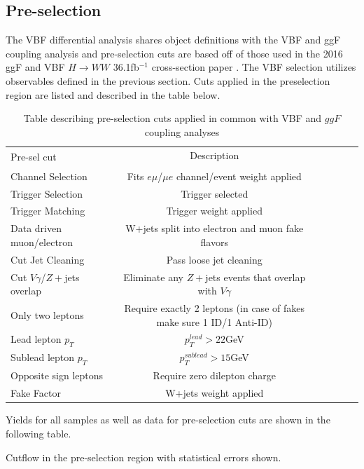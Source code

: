\subsection{Pre-selection}
The VBF differential analysis shares object definitions with the VBF and ggF coupling analysis and pre-selection cuts are based off of those used in the 2016 ggF and VBF $H\rightarrow WW$ 36.1fb$^{-1}$ cross-section paper \cite{Aaboud_2019}. The VBF selection utilizes observables defined in the previous section. Cuts applied in the preselection region are listed and described in the table below. 
\begin{table}[h!]
\centering
\small{
\begin{tabular}{|l|c|c|c|c|c|}
\hline
\multirow{2}{*}{Pre-sel cut}   & Description \\
				&	 \\
\hline
Channel Selection	& Fits $e\mu$/$\mu e$ channel/event weight applied\\  
Trigger Selection	&  Trigger selected \\
Trigger Matching	&  Trigger weight applied  \\
Data driven muon/electron & W+jets split into electron and muon fake flavors \\
Cut Jet Cleaning	& Pass loose jet cleaning \\
Cut $V\gamma$/$Z+$jets overlap & Eliminate any $Z+$jets events that overlap with $V\gamma$ \\ 
Only two leptons       	&  Require exactly 2 leptons (in case of fakes make sure 1 ID/1 Anti-ID) \\
Lead lepton $p_T$	& $p_T^{lead} > 22 $GeV \\
Sublead lepton $p_T$	& $p_T^{sublead} >15 $GeV \\
Opposite sign leptons	&  Require zero dilepton charge \\
Fake Factor	& W+jets weight applied \\
\hline
\end{tabular}
\caption{Table describing pre-selection cuts applied in common with VBF and $ggF$ coupling analyses}
\label{tab:preseldef}
}
\end{table}

Yields for all samples as well as data for pre-selection cuts are shown in the following table.
\begin{table}[h!]
\scalebox{.45}{

}
\caption{Cutflow in the pre-selection region with statistical errors shown.}
\label{tab:preselcut}
\end{table}

